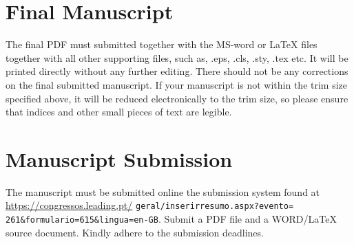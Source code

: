 \documentclass[twocolumn]{rps-esrel2026}
\begin{document}
\section{Final Manuscript}

The final PDF must submitted together with the MS-word or LaTeX files together with all other supporting files, such as, .eps, .cls, .sty, .tex etc.  It will be
printed directly without any further editing. There should not be any corrections on the final submitted manuscript. If your manuscript is not within the trim size
specified above, it will be reduced electronically to the trim size, so please ensure that indices and other small pieces of text are legible.

\section{Manuscript Submission}
The manuscript must be submitted  online the submission system found at 
\url{https://congressos.leading.pt/} {\tt geral/inserirresumo.aspx?evento=} {\tt 261\&formulario=615\&lingua=en-GB}. Submit a PDF file and a
WORD/LaTeX source document.  Kindly adhere to the submission deadlines.  
\end{document}
